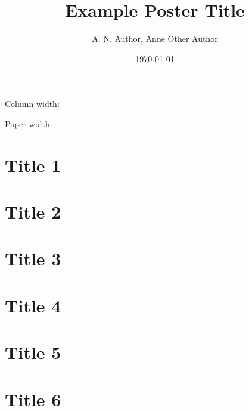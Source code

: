 \documentclass{beamer}
\title{Example Poster Title}
\author{A. N. Author, Anne Other Author}
\institute{School of Hard Knocks}
\date{\today}
\begin{document}
\justify
\begin{frame}[t]
  \maketitle

  \vspace*{1cm}
\begin{postercolumn}{0.0167}
  Column width: \printlen[5][in]{\textwidth}

  Paper width: \printlen[5][in]{\paperwidth}
  \section{Title 1}
  \lipsum[1]

  \section{Title 2}
  \lipsum[2]
  
\end{postercolumn}

\begin{postercolumn}{0.3467}
    \section{Title 3}
    \lipsum[3]

    \section{Title 4}
    \lipsum[4]
\end{postercolumn}


\begin{postercolumn}{0.6767}
  \section{Title 5}
  \lipsum[5]

  \section{Title 6}
  \lipsum[6]
\end{postercolumn}

\end{frame}
\end{document}
